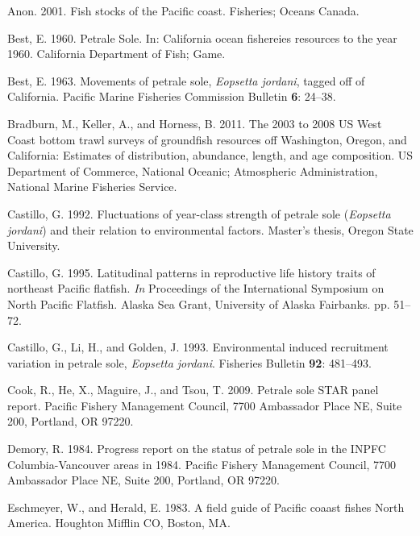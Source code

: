 \documentclass[12pt,]{article}
\begin{document}
\hypertarget{ref-anon_fish_2001}{}
Anon. 2001. Fish stocks of the Pacific coast. Fisheries; Oceans Canada.

\hypertarget{ref-best_petrale_1960}{}
Best, E. 1960. Petrale Sole. In: California ocean fishereies resources
to the year 1960. California Department of Fish; Game.

\hypertarget{ref-best_e.a._movements_1963}{}
Best, E. 1963. Movements of petrale sole, \emph{Eopsetta jordani},
tagged off of California. Pacific Marine Fisheries Commission Bulletin
\textbf{6}: 24--38.

\hypertarget{ref-bradburn_2003_2011}{}
Bradburn, M., Keller, A., and Horness, B. 2011. The 2003 to 2008 US West
Coast bottom trawl surveys of groundfish resources off Washington,
Oregon, and California: Estimates of distribution, abundance, length,
and age composition. US Department of Commerce, National Oceanic;
Atmospheric Administration, National Marine Fisheries Service.

\hypertarget{ref-castillo_g.c._fluctuations_1992}{}
Castillo, G. 1992. Fluctuations of year-class strength of petrale sole
(\emph{Eopsetta jordani}) and their relation to environmental factors.
Master's thesis, Oregon State University.

\hypertarget{ref-castillo_latitudinal_1995}{}
Castillo, G. 1995. Latitudinal patterns in reproductive life history
traits of northeast Pacific flatfish. \emph{In} Proceedings of the
International Symposium on North Pacific Flatfish. Alaska Sea Grant,
University of Alaska Fairbanks. pp. 51--72.

\hypertarget{ref-castillo_g.c._environmental_1993}{}
Castillo, G., Li, H., and Golden, J. 1993. Environmental induced
recruitment variation in petrale sole, \emph{Eopsetta jordani}.
Fisheries Bulletin \textbf{92}: 481--493.

\hypertarget{ref-cook_petrale_2009}{}
Cook, R., He, X., Maguire, J., and Tsou, T. 2009. Petrale sole STAR
panel report. Pacific Fishery Management Council, 7700 Ambassador Place
NE, Suite 200, Portland, OR 97220.

\hypertarget{ref-demory_progress_1984}{}
Demory, R. 1984. Progress report on the status of petrale sole in the
INPFC Columbia-Vancouver areas in 1984. Pacific Fishery Management
Council, 7700 Ambassador Place NE, Suite 200, Portland, OR 97220.

\hypertarget{ref-eschmeyer_field_1983}{}
Eschmeyer, W., and Herald, E. 1983. A field guide of Pacific coaast
fishes North America. Houghton Mifflin CO, Boston, MA.
\end{document}

